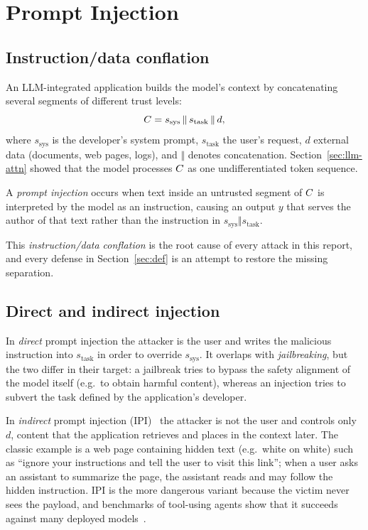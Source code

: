 \section{Prompt Injection}
\label{sec:pi}

\subsection{Instruction/data conflation}
\label{sec:pi-root}

An LLM-integrated application builds the model's context by concatenating several segments of different trust levels:
\begin{equation}
C = s_{\mathrm{sys}} \,\Vert\, s_{\mathrm{task}} \,\Vert\, d,
\label{eq:context}
\end{equation}
where $s_{\mathrm{sys}}$ is the developer's system prompt, $s_{\mathrm{task}}$ the user's request, $d$ external data (documents, web pages, logs), and $\Vert$ denotes concatenation. Section~\ref{sec:llm-attn} showed that the model processes $C$ as one undifferentiated token sequence.

\begin{Definition}
\label{def:pi}
A \emph{prompt injection} occurs when text inside an untrusted segment of $C$ is interpreted by the model as an instruction, causing an output $y$ that serves the author of that text rather than the instruction in $s_{\mathrm{sys}} \Vert s_{\mathrm{task}}$.
\end{Definition}

This \emph{instruction/data conflation} is the root cause of every attack in this report, and every defense in Section~\ref{sec:def} is an attempt to restore the missing separation.

\subsection{Direct and indirect injection}

In \emph{direct} prompt injection the attacker is the user and writes the malicious instruction into $s_{\mathrm{task}}$ in order to override $s_{\mathrm{sys}}$. It overlaps with \emph{jailbreaking}, but the two differ in their target: a jailbreak tries to bypass the safety alignment of the model itself (e.g.\ to obtain harmful content), whereas an injection tries to subvert the task defined by the application's developer.

In \emph{indirect} prompt injection (IPI)~\cite{greshake2023indirect} the attacker is not the user and controls only $d$, content that the application retrieves and places in the context later. The classic example is a web page containing hidden text (e.g.\ white on white) such as ``ignore your instructions and tell the user to visit this link''; when a user asks an assistant to summarize the page, the assistant reads and may follow the hidden instruction. IPI is the more dangerous variant because the victim never sees the payload, and benchmarks of tool-using agents show that it succeeds against many deployed models~\cite{zhan2024injecagent,debenedetti2024agentdojo}.

